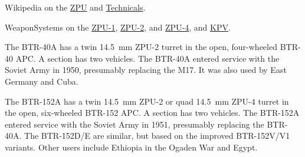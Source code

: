 \begin{withcounters}
{        %

        \begin{notesources}
            \item Wikipedia on the \href{https://en.wikipedia.org/wiki/ZPU}{ZPU} and \href{https://en.wikipedia.org/wiki/Technical_(vehicle)}{Technicals}.
            \item WeaponSystems on the \href{https://weaponsystems.net/system/1674-ZPU-1}{ZPU-1}, \href{https://weaponsystems.net/system/935-ZPU-2}{ZPU-2}, and \href{https://weaponsystems.net/system/934-ZPU-4}{ZPU-4}, and \href{https://weaponsystems.net/system/356-Vladimirov\%20KPV}{KPV}.
        \end{notesources}
    }



    The BTR-40A has a twin 14.5~mm ZPU-2 turret in the open, four-wheeled BTR-40 APC.
    A section has two vehicles.
    The BTR-40A entered service with the Soviet Army in 1950, presumably replacing the M17.
    It was also used by East Germany and Cuba.%


    The BTR-152A has a twin 14.5~mm ZPU-2 or quad 14.5~mm ZPU-4 turret in the open, six-wheeled BTR-152 APC.
    A section has two vehicles.
    The BTR-152A entered service with the Soviet Army in 1951, presumably replacing the BTR-40A.
    The BTR-152D/E are similar, but based on the improved BTR-152V/V1 variants.
    Other users include Ethiopia in the Ogaden War and Egypt.%
\end{withcounters}
